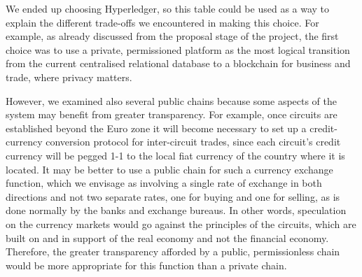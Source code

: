 We ended up choosing Hyperledger, so this table could be used as a way to explain the different trade-offs we encountered in making this choice. For example, as already discussed from the proposal stage of the project, the first choice was to use a private, permissioned platform as the most logical transition from the current centralised relational database to a blockchain for business and trade, where privacy matters.

However, we examined also several public chains because some aspects of the system may benefit from greater transparency. For example, once circuits are established beyond the Euro zone it will become necessary to set up a credit-currency conversion protocol for inter-circuit trades, since each circuit's credit currency will be pegged 1-1 to the local fiat currency of the country where it is located. It may be better to use a public chain for such a currency exchange function, which we envisage as involving a single rate of exchange in both directions and not two separate rates, one for buying and one for selling, as is done normally by the banks and exchange bureaus. In other words, speculation on the currency markets would go against the principles of the circuits, which are built on and in support of the real economy and not the financial economy. Therefore, the greater transparency afforded by a public, permissionless chain would be more appropriate for this function than a private chain.


